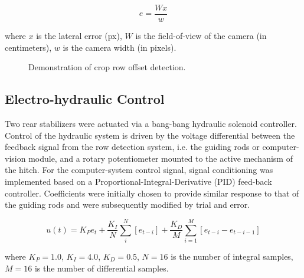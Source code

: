 \documentclass[authoryear]{elsarticle}
\begin{document}
\begin{equation}
  e = \frac{Wx}{w}
  \label{eq:px2mm}
\end{equation}
\begin{flushleft}
where $x$ is the lateral error (px), $W$ is the field-of-view of the camera (in
centimeters), $w$ is the camera width (in pixels).
\end{flushleft}

\begin{figure}
  \centering
  \caption{Demonstration of crop row offset detection.}
  \label{fig:row_estimation}
\end{figure}

\subsection{Electro-hydraulic Control}
Two rear stabilizers were actuated via a bang-bang hydraulic
solenoid controller. Control of the hydraulic system is driven by the voltage
differential between the feedback signal from the row detection
system, i.e. the guiding rods or computer-vision module, and a
rotary potentiometer mounted to the active mechanism of the hitch. 
For the computer-system control signal, signal conditioning was
implemented based on a Proportional-Integral-Derivative (PID)
feed-back controller. Coefficients were initially chosen to provide
similar response to that of the guiding rods and were subsequently
modified by trial and error.

\begin{equation}
    u(t) = K_{P}e_{t} + \frac{K_{I}}{N}\displaystyle\sum_i^N \left[
      e_{t-i} \right] +
    \frac{K_{D}}{M}\displaystyle\sum_{i=1}^M \left[e_{t-i}-e_{t-i-1}\right]
  \label{eq:pid}
\end{equation}
\begin{flushleft}
where $K_{P}=1.0$, $K_{I}=4.0$, $K_{D}=0.5$, $N=16$ is the number of integral samples,
$M=16$ is the number of differential samples.
\end{flushleft}
\end{document}
